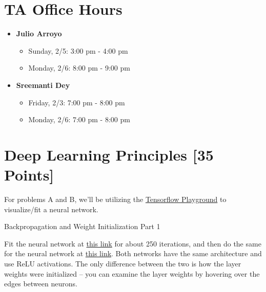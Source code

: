 \section*{TA Office Hours}
\begin{itemize}
    \item \textbf{Julio Arroyo}
        \begin{itemize}
            \item Sunday, 2/5: 3:00 pm - 4:00 pm
            \item Monday, 2/6: 8:00 pm - 9:00 pm
        \end{itemize}
    \item \textbf{Sreemanti Dey}
        \begin{itemize}
            \item Friday, 2/3: 7:00 pm - 8:00 pm
            \item Monday, 2/6: 7:00 pm - 8:00 pm
        \end{itemize}
\end{itemize}


\newpage
\section{Deep Learning Principles [35 Points]}

 For problems A and B, we'll be utilizing the \href{http://playground.tensorflow.org/}{Tensorflow Playground} to visualize/fit a neural network.

\begin{problem}[5]
  Backpropagation and Weight Initialization Part 1
\end{problem}

Fit the neural network at \href{http://playground.tensorflow.org/#activation=relu&batchSize=10&dataset=circle&regDataset=reg-plane&learningRate=0.03&regularizationRate=0&noise=0&networkShape=4,2&seed=0.65409&showTestData=false&discretize=false&percTrainData=50&x=true&y=true&xTimesY=false&xSquared=false&ySquared=false&cosX=false&sinX=false&cosY=false&sinY=false&collectStats=false&problem=classification&initZero=false&hideText=false}{this link} for about 250 iterations, and then do the same for the neural network at  \href{http://playground.tensorflow.org//\#activation=relu&batchSize=10&dataset=circle&regDataset=reg-plane&learningRate=0.03&regularizationRate=0&noise=0&networkShape=4,2&seed=0.6&showTestData=false&discretize=false&percTrainData=50&x=true&y=true&xTimesY=false&xSquared=false&ySquared=false&cosX=false&sinX=false&cosY=false&sinY=false&collectStats=false&problem=classification&initZero=true&hideText=false}{this link}.  Both networks have the same architecture and use ReLU activations.  The only difference between the two is how the layer weights were initialized -- you can examine the layer weights by hovering over the edges between neurons.

